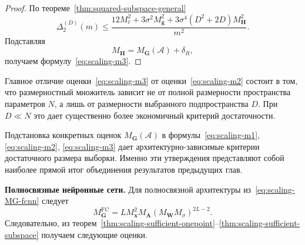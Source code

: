 \begin{proof}
    По теореме~\ref{thm:squared-subspace-general}
    \begin{equation}
        \Delta_2^{(D)}(m)
        \le
        \frac{
            12M_{\ell}^2
            +
            3\sigma^2 M_{\mathbf g}^2
            +
            3\sigma^4(D^2+2D)M_{\mathbf H}^2
        }{m^2}.
    \end{equation}
    Подставляя
    \begin{equation}
        M_{\mathbf H}=M_{\mathbf G}(\mathcal A)+\delta_R,
    \end{equation}
    получаем формулу~\eqref{eq:scaling-m3}.
\end{proof}

Главное отличие оценки~\eqref{eq:scaling-m3} от оценки~\eqref{eq:scaling-m2} состоит в том, что размерностный множитель зависит не от полной размерности пространства параметров $N$, а лишь от размерности выбранного подпространства $D$. При $D\ll N$ это дает существенно более экономичный критерий достаточности.

Подстановка конкретных оценок $M_{\mathbf G}(\mathcal A)$ в формулы~\eqref{eq:scaling-m1}, \eqref{eq:scaling-m2}, \eqref{eq:scaling-m3} дает архитектурно-зависимые критерии достаточного размера выборки. Именно эти утверждения представляют собой наиболее прямой итог объединения результатов предыдущих глав.

\textbf{Полносвязные нейронные сети.} Для полносвязной архитектуры из~\eqref{eq:scaling-MG-fcnn} следует
\begin{equation}
    M_{\mathbf G}^{\mathrm{FC}}
    =
    L M_{\mathbf x}^2 M_{\mathbf A}(M_{\mathbf W}M_{\sigma})^{2L-2}.
\end{equation}
Следовательно, из теорем~\ref{thm:scaling-sufficient-onepoint}--\ref{thm:scaling-sufficient-subspace} получаем следующие оценки.

